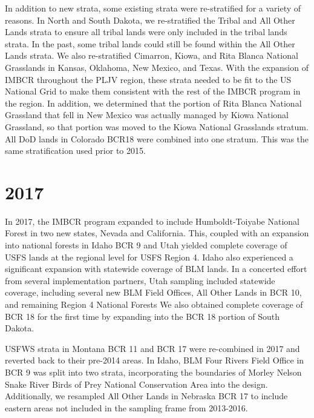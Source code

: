 \documentclass[
  letterpaper,
  DIV=11,
  numbers=noendperiod,
  oneside]{scrreprt}
\begin{document}
In addition to new strata, some existing strata were re-stratified for a
variety of reasons. In North and South Dakota, we re-stratified the
Tribal and All Other Lands strata to ensure all tribal lands were only
included in the tribal lands strata. In the past, some tribal lands
could still be found within the All Other Lands strata. We also
re-stratified Cimarron, Kiowa, and Rita Blanca National Grasslands in
Kansas, Oklahoma, New Mexico, and Texas. With the expansion of IMBCR
throughout the PLJV region, these strata needed to be fit to the US
National Grid to make them consistent with the rest of the IMBCR program
in the region. In addition, we determined that the portion of Rita
Blanca National Grassland that fell in New Mexico was actually managed
by Kiowa National Grassland, so that portion was moved to the Kiowa
National Grasslands stratum. All DoD lands in Colorado BCR18 were
combined into one stratum. This was the same stratification used prior
to 2015.

\hypertarget{section-8}{%
\section*{\texorpdfstring{\textbf{2017}}{2017}}\label{section-8}}


In 2017, the IMBCR program expanded to include Humboldt-Toiyabe National
Forest in two new states, Nevada and California. This, coupled with an
expansion into national forests in Idaho BCR 9 and Utah yielded complete
coverage of USFS lands at the regional level for USFS Region 4. Idaho
also experienced a significant expansion with statewide coverage of BLM
lands. In a concerted effort from several implementation partners, Utah
sampling included statewide coverage, including several new BLM Field
Offices, All Other Lands in BCR 10, and remaining Region 4 National
Forests We also obtained complete coverage of BCR 18 for the first time
by expanding into the BCR 18 portion of South Dakota.

USFWS strata in Montana BCR 11 and BCR 17 were re-combined in 2017 and
reverted back to their pre-2014 areas. In Idaho, BLM Four Rivers Field
Office in BCR 9 was split into two strata, incorporating the boundaries
of Morley Nelson Snake River Birds of Prey National Conservation Area
into the design. Additionally, we resampled All Other Lands in Nebraska
BCR 17 to include eastern areas not included in the sampling frame from
2013-2016.
\end{document}
